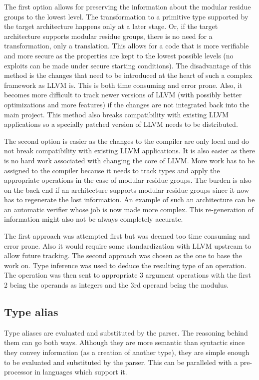 The first option allows for preserving the information about the
modular residue groups to the lowest level. The transformation to a
primitive type supported by the target architecture happens only at a
later stage. Or, if the target architecture supports modular residue
groups, there is no need for a transformation, only a translation.
This allows for a code that is more verifiable and more secure as the
properties are kept to the lowest possible levels (no exploits can be
made under secure starting conditions). The disadvantage of this
method is the changes that need to be introduced at the heart of such
a complex framework as LLVM is. This is both time consuming and error
prone. Also, it becomes more difficult to track newer versions of LLVM
(with possibly better optimizations and more features) if the changes
are not integrated back into the main project. This method also breaks
compatibility with existing LLVM applications so a specially patched
version of LLVM needs to be distributed.

The second option is easier as the changes to the compiler are only
local and do not break compatibility with existing LLVM applications.
It is also easier as there is no hard work associated with changing
the core of LLVM. More work has to be assigned to the compiler because
it needs to track types and apply the appropriate operations in the
case of modular residue groups. The burden is also on the back-end if
an architecture supports modular residue groups since it now has to
regenerate the lost information. An example of such an architecture
can be an automatic verifier whose job is now made more complex. This
re-generation of information might also not be always completely
accurate.

The first approach was attempted first but was deemed too time
consuming and error prone. Also it would require some standardization
with LLVM upstream to allow future tracking. The second approach was
chosen as the one to base the work on. Type inference was used to
deduce the resulting type of an operation. The operation was then sent
to appropriate 3 argument operations with the first 2 being the
operands as integers and the 3rd operand being the modulus.

\subsection{Type alias}

Type aliases are evaluated and substituted by the parser. The
reasoning behind them can go both ways. Although they are more
semantic than syntactic since they convey information (as a creation
of another type), they are simple enough to be evaluated and
substituted by the parser. This can be paralleled with a pre-processor
in languages which support it.

